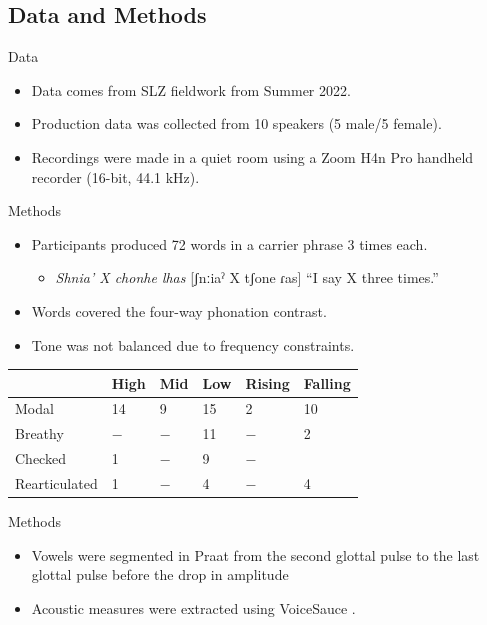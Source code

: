 \documentclass[professionalfonts]{beamer}
\providecommand{\lsptoprule}{\midrule\toprule}
\providecommand{\lspbottomrule}{\bottomrule\midrule}
\begin{document}
\subsection{Data and Methods}
\begin{frame}{Data}
  \begin{itemize}
    \item Data comes from SLZ fieldwork from Summer 2022.
    \item Production data was collected from 10 speakers (5 male/5 female).
    \item Recordings were made in a quiet room using a Zoom H4n Pro handheld recorder (16-bit, 44.1 kHz).
  \end{itemize}
\end{frame}
\begin{frame}{Methods}
  \begin{itemize}
    \item Participants produced 72 words in a carrier phrase 3 times each.
    \begin{itemize}
      \item \textit{Shnia' X chonhe lhas} [ʃnːiaˀ X tʃone ɾas] ``I say X three times.''
    \end{itemize}
    \item Words covered the four-way phonation contrast.
    \item Tone was not balanced due to frequency constraints. 
  \end{itemize}
  \begin{center}
  \begin{tabular}{llllll}
    \lsptoprule
    & High & Mid & Low & Rising & Falling\\
    \midrule
    Modal & 14 & 9 & 15 & 2 & 10 \\
    Breathy & $-$ & $-$ & 11 & $-$ & 2 \\
    Checked & 1 & $-$ & 9 & $-$ & \\
    Rearticulated & 1 & $-$ & 4 & $-$ & 4 \\
    \lspbottomrule
  \end{tabular}
  \end{center}
\end{frame}

\begin{frame}{Methods}
  \begin{itemize}
    \item Vowels were segmented in Praat from the second glottal pulse to the last glottal pulse before the drop in amplitude \citep{garellekAcousticDiscriminabilityComplex2020}
    \item Acoustic measures were extracted using VoiceSauce \citep{shueVoiceSauceProgramVoice2011}.
  \end{itemize}
\end{frame}
\end{document}
